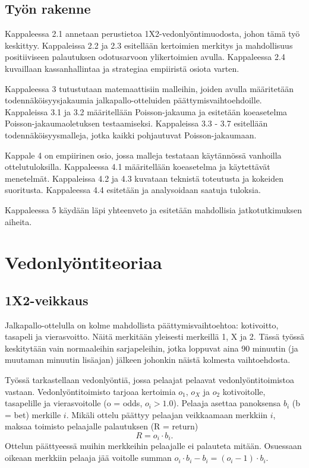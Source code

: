 \documentclass[a4paper,finnish,titlepage,12pt]{article}
\begin{document}
\subsection{Työn rakenne}
Kappaleessa 2.1 annetaan perustietoa 1X2-vedonlyöntimuodosta, johon tämä työ keskittyy. Kappaleissa 2.2 ja 2.3 esitellään kertoimien merkitys ja mahdollisuus positiiviseen palautuksen odotusarvoon ylikertoimien avulla. Kappaleessa 2.4 kuvaillaan kassanhallintaa ja strategiaa empiiristä osiota varten.

Kappaleessa 3 tutustutaan matemaattisiin malleihin, joiden avulla määritetään todennäköisyysjakaumia jalkapallo-otteluiden päättymisvaihtoehdoille. Kappaleissa 3.1 ja 3.2 määritellään Poisson-jakauma ja esitetään koeasetelma Poisson-jakaumaoletuksen testaamiseksi.  Kappaleissa 3.3 - 3.7 esitellään todennäköisyysmalleja, jotka kaikki pohjautuvat Poisson-jakaumaan.

Kappale 4 on empiirinen osio, jossa malleja testataan käytännössä vanhoilla ottelutuloksilla. Kappaleessa 4.1 määritellään koeasetelma ja käytettävät menetelmät. Kappaleissa 4.2 ja 4.3 kuvataan teknistä toteutusta ja kokeiden suoritusta. Kappaleessa 4.4 esitetään ja analysoidaan saatuja tuloksia.

Kappaleessa 5 käydään läpi yhteenveto ja esitetään mahdollisia jatkotutkimuksen aiheita.

\section{Vedonlyöntiteoriaa}
\subsection{1X2-veikkaus}
Jalkapallo-ottelulla on kolme mahdollista päättymisvaihtoehtoa: kotivoitto, tasapeli ja vierasvoitto. Näitä merkitään yleisesti merkeillä 1, X ja 2. Tässä työssä keskitytään vain normaaleihin sarjapeleihin, jotka loppuvat aina 90 minuutin (ja muutaman minuutin lisäajan) jälkeen johonkin näistä kolmesta vaihtoehdosta.

Työssä tarkastellaan vedonlyöntiä, jossa pelaajat pelaavat vedonlyöntitoimistoa vastaan. Vedonlyöntitoimisto tarjoaa kertoimia $o_1$, $o_X$ ja $o_2$ kotivoitolle, tasapelille ja vierasvoitolle (o = odds, $o_i > 1.0$). Pelaaja asettaa panoksensa $b_i$ (b = bet) merkille $i$. Mikäli ottelu päättyy pelaajan veikkaamaan merkkiin $i$, maksaa toimisto pelaajalle palautuksen (R = return)
\begin{equation}
R = o_i \cdot b_i.
\end{equation}
Ottelun päättyeessä muihin merkkeihin pelaajalle ei palauteta mitään. Osuessaan oikeaan merkkiin pelaaja jää voitolle summan $o_i \cdot b_i - b_i = (o_i - 1) \cdot b_i$.
\end{document}
